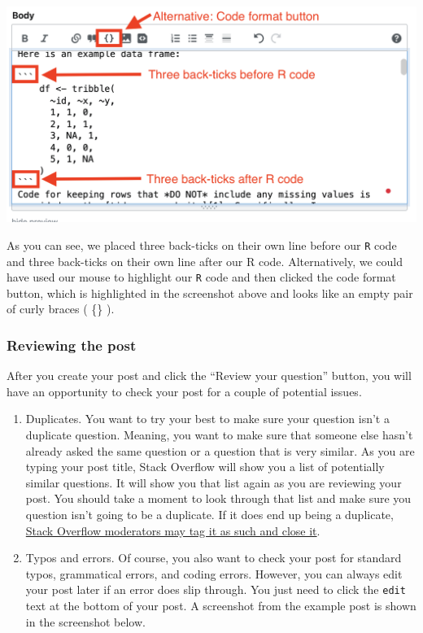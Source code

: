 \documentclass[
  letterpaper,
  DIV=11,
  numbers=noendperiod]{scrreprt}
\begin{document}
\includegraphics{chapters/asking_questions/so_3_code_block.png}

As you can see, we placed three back-ticks on their own line before our
\texttt{R} code and three back-ticks on their own line after our R code.
Alternatively, we could have used our mouse to highlight our \texttt{R}
code and then clicked the code format button, which is highlighted in
the screenshot above and looks like an empty pair of curly braces ( \{\}
).

\subsubsection{Reviewing the post}\label{reviewing-the-post}

After you create your post and click the ``Review your question''
button, you will have an opportunity to check your post for a couple of
potential issues.

\begin{enumerate}
\def\labelenumi{\arabic{enumi}.}
\item
  Duplicates. You want to try your best to make sure your question isn't
  a duplicate question. Meaning, you want to make sure that someone else
  hasn't already asked the same question or a question that is very
  similar. As you are typing your post title, Stack Overflow will show
  you a list of potentially similar questions. It will show you that
  list again as you are reviewing your post. You should take a moment to
  look through that list and make sure you question isn't going to be a
  duplicate. If it does end up being a duplicate,
  \href{https://stackoverflow.com/help/duplicates}{Stack Overflow
  moderators may tag it as such and close it}.
\item
  Typos and errors. Of course, you also want to check your post for
  standard typos, grammatical errors, and coding errors. However, you
  can always edit your post later if an error does slip through. You
  just need to click the \texttt{edit} text at the bottom of your post.
  A screenshot from the example post is shown in the screenshot below.
\end{enumerate}
\end{document}
